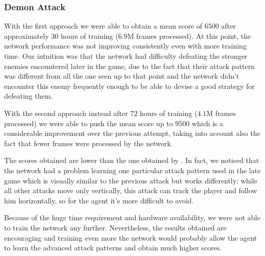 \documentclass[10pt,twocolumn,letterpaper]{article}
\begin{document}
\subsubsection{Demon Attack} 
With the first approach we were able to obtain a mean score of $6500$ after approximately $30$ hours of training ($6.9$M frames processed). At this point, the network performance was not improving consistently even with more training time. Our intuition was that the network had difficulty defeating the stronger enemies encountered later in the game, due to the fact that their attack pattern was different from all the one seen up to that point and the network didn't encounter this enemy frequently enough to be able to devise a good strategy for defeating them.

With the second approach instead after $72$ hours of training ($4.1$M frames processed) we were able to push the mean score up to $9500$ which is a considerable improvement over the previous attempt, taking into account also the fact that fewer frames were processed by the network.

The scores obtained are lower than the one obtained by \cite{DBLP:journals/corr/abs-1710-02298}. In fact, we noticed that the network had a problem learning one particular attack pattern used in the late game which is visually similar to the previous attack but works differently: while all other attacks move only vertically, this attack can track the player and follow him horizontally, so for the agent it's more difficult to avoid.

Because of the huge time requirement and hardware availability, we were not able to train the network any further. Nevertheless, the results obtained are encouraging and training even more the network would probably allow the agent to learn the advanced attack patterns and obtain much higher scores.

{\small


}
\end{document}
